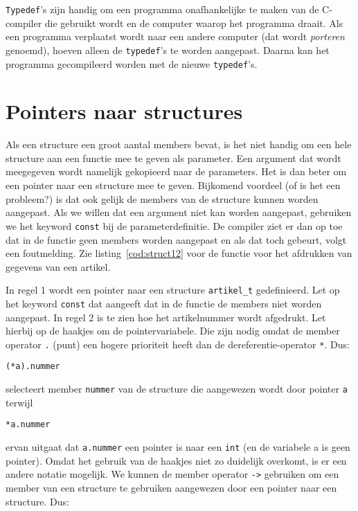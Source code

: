 \texttt{Typedef}'s zijn handig om een programma onafhankelijke te maken van de C-compiler die gebruikt wordt en de computer waarop het programma draait. Als een programma verplaatst wordt naar een andere computer (dat wordt \textsl{porteren} genoemd), hoeven alleen de \texttt{typedef}'s te worden aangepast. Daarna kan het programma gecompileerd worden met de nieuwe \texttt{typedef}'s.

\section{Pointers naar structures}
Als een structure een groot aantal members bevat, is het niet handig om een hele structure aan een functie mee te geven als parameter. Een argument dat wordt meegegeven wordt namelijk gekopieerd naar de parameters. Het is dan beter om een pointer naar een structure mee te geven. Bijkomend voordeel (of is het een probleem?) is dat ook gelijk de members van de structure kunnen worden aangepast. Als we willen dat een argument niet kan worden aangepast, gebruiken we het keyword \texttt{const} bij de parameterdefinitie. De compiler ziet er dan op toe dat in de functie geen members worden aangepast en als dat toch gebeurt, volgt een foutmelding. Zie listing~\ref{cod:struct12} voor de functie voor het afdrukken van gegevens van een artikel.


In regel 1 wordt een pointer naar een structure \texttt{artikel\_t} gedefinieerd. Let op het keyword \texttt{const} dat aangeeft dat in de functie de members niet worden aangepast. In regel 2 is te zien hoe het artikelnummer wordt afgedrukt. Let hierbij op de haakjes om de pointervariabele. Die zijn nodig omdat de member operator \texttt{.} (punt) een hogere prioriteit heeft dan de dereferentie-operator \texttt{*}. Dus:

\hspace*{1em}\texttt{(*a).nummer}

selecteert member \texttt{nummer} van de structure die aangewezen wordt door pointer \texttt{a} terwijl

\hspace*{1em}\texttt{*a.nummer}

ervan uitgaat dat \texttt{a.nummer} een pointer is naar een \texttt{int} (en de variabele a is geen pointer).
Omdat het gebruik van de haakjes niet zo duidelijk overkomt, is er een andere notatie mogelijk. We kunnen de member operator \texttt{->}\indexop{->} gebruiken om een member van een structure te gebruiken aangewezen door een pointer naar een structure. Dus:

